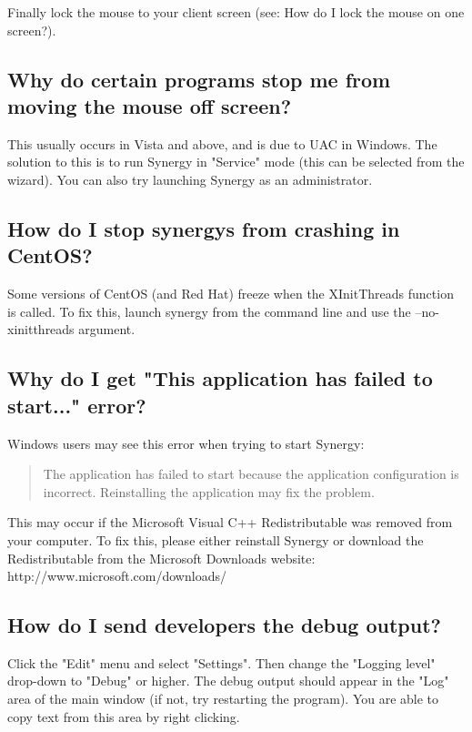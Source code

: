 Finally lock the mouse to your client screen
(see: How do I lock the mouse on one screen?).

\subsection*{Why do certain programs stop me from moving the mouse off screen?}

This usually occurs in Vista and above, and is due to UAC in Windows. The
solution to this is to run Synergy in "Service" mode (this can be selected
from the wizard). You can also try launching Synergy as an administrator.

\subsection*{How do I stop synergys from crashing in CentOS?}

Some versions of CentOS (and Red Hat) freeze when the XInitThreads function
is called. To fix this, launch synergy from the command line and use the
--no-xinitthreads argument.

\subsection*{Why do I get "This application has failed to start..." error?}

Windows users may see this error when trying to start Synergy:

\begin{quote}
The application has failed to start because the application configuration is
incorrect. Reinstalling the application may fix the problem.
\end{quote}

This may occur if the Microsoft Visual C++ Redistributable was
removed from your computer. To fix this, please either reinstall Synergy
or download the Redistributable from the Microsoft Downloads website:
http://www.microsoft.com/downloads/

\subsection*{How do I send developers the debug output?}

Click the "Edit" menu and select "Settings". Then change the "Logging level"
drop-down to "Debug" or higher. The debug output should appear in the "Log"
area of the main window (if not, try restarting the program). You are able
to copy text from this area by right clicking.

